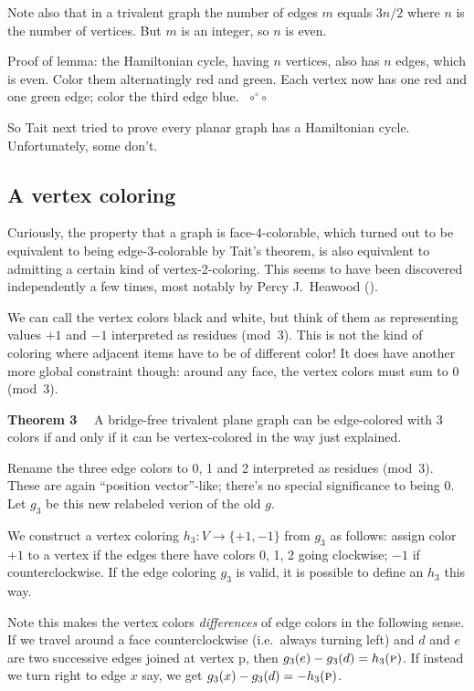 \documentclass[12pt]{article}
\let\S\scriptstyle
\def\qed{ ${\S\circ}\!{}^\circ\!{\S\circ}$}
\begin{document}
Note also that in a trivalent graph the number of edges $m$ equals $3n/2$
where $n$ is the number of vertices. But $m$ is an integer, so $n$ is even.

Proof of lemma: the Hamiltonian cycle, having $n$ vertices, also has $n$ edges,
which is even. Color them alternatingly red and green. Each vertex now has one
red and one green edge; color the third edge blue.~\qed

So Tait next tried to prove every planar graph has a Hamiltonian cycle.
Unfortunately, some don't.

\vfill\pagebreak
\subsection*{A vertex coloring}

Curiously, the property that a graph is face-4-colorable, which turned out to
be equivalent to being edge-3-colorable by Tait's theorem, is also equivalent
to admitting a certain kind of vertex-2-coloring. This seems to have been
discovered independently a few times, most notably by Percy J.\ Heawood ().

We can call the vertex colors black and white, but think of them as representing values $+1$ and $-1$ interpreted as residues (mod~3).
This is not the kind of coloring where adjacent items have to be of different
color! It does have another more global constraint though: around any face, the vertex colors must sum to 0 (mod~3).

{\bf Theorem 3}$\quad$ A bridge-free trivalent plane graph can be edge-colored
with 3 colors if and only if it can be vertex-colored in the way just
explained.

Rename the three edge colors to 0, 1 and 2 interpreted as residues (mod~3).
These are again ``position vector''-like; there's no special significance
to being 0. Let $g_3$ be this new relabeled verion of the old $g$.

We construct a vertex coloring $h_3 : V \to \{+1,-1\}$ from $g_3$ as follows:
assign color $+1$ to a vertex if the edges there have colors 0, 1, 2 going
clockwise; $-1$ if counterclockwise. If the edge coloring $g_3$ is valid,
it is possible to define an $h_3$ this way.

Note this makes the vertex colors {\em differences\/} of edge colors in the
following sense. If we travel around a face counterclockwise (i.e.\ always
turning left) and $d$ and $e$ are two successive edges joined at vertex
{\sc p}, then $g_3(e)-g_3(d) = h_3(\hbox{\sc p})$. If instead we turn right to edge $x$ say, we get $g_3(x)-g_3(d) = -h_3(\hbox{\sc p})$.
\end{document}
